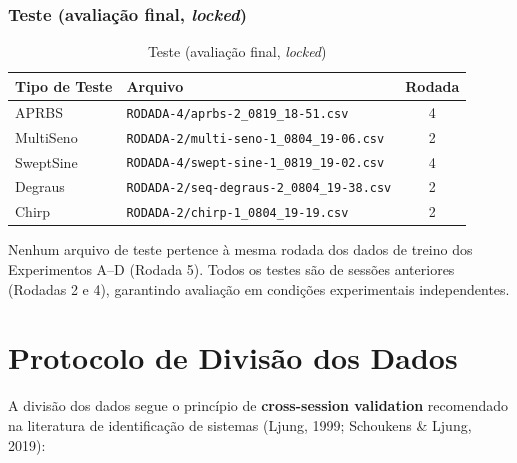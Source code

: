\documentclass[11pt,a4paper]{article}
\begin{document}
\subsubsection*{Teste (avaliação final, \textit{locked})}

\begin{table}[hbt!]
\centering
\caption{Teste (avaliação final, \textit{locked})}
\vspace{0.2cm}
\begin{tabular}{llc}
\toprule
\textbf{Tipo de Teste} & \textbf{Arquivo} & \textbf{Rodada} \\
\midrule
APRBS & \texttt{RODADA-4/aprbs-2\_0819\_18-51.csv} & 4 \\
MultiSeno & \texttt{RODADA-2/multi-seno-1\_0804\_19-06.csv} & 2 \\
SweptSine & \texttt{RODADA-4/swept-sine-1\_0819\_19-02.csv} & 4 \\
Degraus & \texttt{RODADA-2/seq-degraus-2\_0804\_19-38.csv} & 2 \\
Chirp & \texttt{RODADA-2/chirp-1\_0804\_19-19.csv} & 2 \\
\bottomrule
\end{tabular}
\end{table}

\begin{tcolorbox}[colback=blue!5!white,colframe=blue!75!black,title=Princípio de separação cross-session]
Nenhum arquivo de teste pertence à mesma rodada dos dados de treino dos Experimentos A--D (Rodada 5). Todos os testes são de sessões anteriores (Rodadas 2 e 4), garantindo avaliação em condições experimentais independentes.
\end{tcolorbox}

\section{Protocolo de Divisão dos Dados}

A divisão dos dados segue o princípio de \textbf{cross-session validation} recomendado na literatura de identificação de sistemas (Ljung, 1999; Schoukens \& Ljung, 2019):
\end{document}
